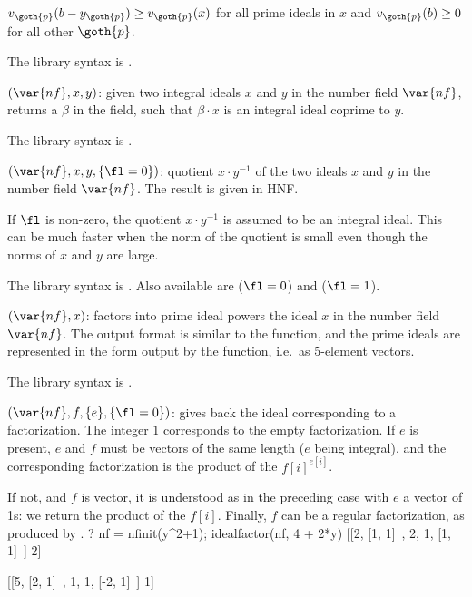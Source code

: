 $v_{\goth{p}}(b - y_{\goth{p}}) \geq v_{\goth{p}}(x)$ for all prime ideals
in $x$ and $v_{\goth{p}}(b)\geq 0$ for all other $\goth{p}$.

The library syntax is .

$(\var{nf},x,y)$: \label{se:idealcoprime}given two integral ideals $x$ and $y$
in the number field $\var{nf}$, returns a $\beta$ in the field,
such that $\beta\cdot x$ is an integral ideal coprime to $y$.

The library syntax is .

$(\var{nf},x,y,\{\fl=0\})$: \label{se:idealdiv}quotient $x\cdot y^{-1}$ of the two ideals $x$ and $y$ in the number
field $\var{nf}$. The result is given in HNF.

If $\fl$ is non-zero, the quotient $x \cdot y^{-1}$ is assumed to be an
integral ideal. This can be much faster when the norm of the quotient is
small even though the norms of $x$ and $y$ are large.

The library syntax is .
Also available are 
($\fl=0$) and  ($\fl=1$).

$(\var{nf},x)$: \label{se:idealfactor}factors into prime ideal powers the
ideal $x$ in the number field $\var{nf}$. The output format is similar to the
 function, and the prime ideals are represented in the form
output by the  function, i.e.~as 5-element vectors.

The library syntax is .

$(\var{nf},f,\{e\},\{\fl = 0\})$: \label{se:idealfactorback}gives back the ideal corresponding to a factorization. The integer $1$
corresponds to the empty factorization.
If $e$ is present, $e$ and $f$ must be vectors of the same length ($e$ being
integral), and the corresponding factorization is the product of the
$f[i]^{e[i]}$.

If not, and $f$ is vector, it is understood as in the preceding case with $e$
a vector of 1s: we return the product of the $f[i]$. Finally, $f$ can be a
regular factorization, as produced by .
\bprog
? nf = nfinit(y^2+1); idealfactor(nf, 4 + 2*y)
[[2, [1, 1]~, 2, 1, [1, 1]~] 2]

[[5, [2, 1]~, 1, 1, [-2, 1]~] 1]

